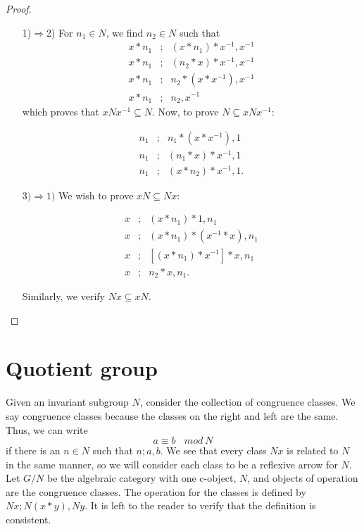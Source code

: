 \documentclass [12pt]{book}
\begin{document}
\begin{proof} \makebox[5pt][]{}\mbox {}

\begin{itemize}\item[1)$\Rightarrow$2)] For $n_1\in N$, we find $n_2\in N$ such that \begin{eqnarray}\nonumber x*n_{1}&;&(x*n_{1})*x^{-1},x^{-1}\\\nonumber x*n_{1}&;&(n_{2}*x)*x^{-1},x^{-1}\\\nonumber x*n_{1}&;&n_{2}*(x*x^{-1}),x^{-1}\\\nonumber x*n_{1}&;&n_{2},x^{-1} \end{eqnarray}which proves that $xNx^{-1}\subseteq N$. Now, to prove $N\subseteq xNx^{-1}$:

\begin{eqnarray}\nonumber n_{1}&;&n_{1}*(x*x^{-1}),1\\\nonumber n_{1}&;&(n_{1}*x)*x^{-1},1\\\nonumber n_{1}&;&(x*n_{2})*x^{-1},1.\end{eqnarray}

\item[$3)\Rightarrow1)$] We wish to prove $xN\subseteq Nx$:

\begin{eqnarray}\nonumber x&;&(x*n_{1})*1,n_{1}\\\nonumber x&;&(x*n_{1})*(x^{-1}*x),n_{1}\\\nonumber x&;&[(x*n_{1})*x^{-1}]*x,n_1\\\nonumber x&;&n_{2}*x,n_1.\end{eqnarray}

Similarly, we verify $Nx\subseteq xN$.

\end{itemize}

\end{proof}

\section{Quotient group}

Given an invariant subgroup $N$, consider the collection of congruence classes. We say congruence classes because the classes on the right and left are the same. Thus, we can write $$a\equiv b~~~~mod~N$$ if there is an $n\in N$ such that $n;a,b$. We see that every class $Nx$ is related to $N$ in the same manner, so we will consider each class to be a reflexive arrow for $N$. Let $G/N$ be the algebraic category with one c-object, $N$, and objects of operation are the congruence classes. The operation for the classes is defined by $Nx;N(x*y),Ny$. It is left to the reader to verify that the definition is consistent.
\end{document}
